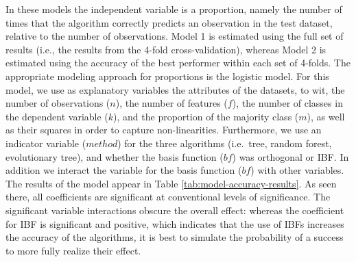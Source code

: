 \documentclass[]{elsarticle} %
\begin{document}
In these models the independent variable is a proportion, namely the
number of times that the algorithm correctly predicts an observation in
the test dataset, relative to the number of observations. Model 1 is
estimated using the full set of results (i.e., the results from the
4-fold cross-validation), whereas Model 2 is estimated using the
accuracy of the best performer within each set of 4-folds. The
appropriate modeling approach for proportions is the logistic model. For
this model, we use as explanatory variables the attributes of the
datasets, to wit, the number of observations (\(n\)), the number of
features (\(f\)), the number of classes in the dependent variable
(\(k\)), and the proportion of the majority class (\(m\)), as well as
their squares in order to capture non-linearities. Furthermore, we use
an indicator variable (\(method\)) for the three algorithms (i.e.~tree,
random forest, evolutionary tree), and whether the basis function
(\(bf\)) was orthogonal or IBF. In addition we interact the variable for
the basis function (\(bf\)) with other variables. The results of the
model appear in Table \ref{tab:model-accuracy-results}. As seen there,
all coefficients are significant at conventional levels of significance.
The significant variable interactions obscure the overall effect:
whereas the coefficient for IBF is significant and positive, which
indicates that the use of IBFs increases the accuracy of the algorithms,
it is best to simulate the probability of a success to more fully
realize their effect.
\end{document}
